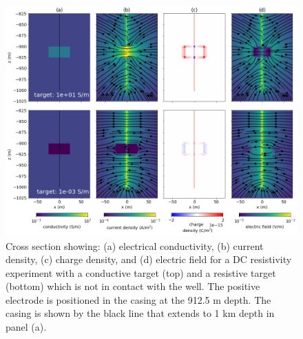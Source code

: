 \begin{figure}
    \begin{center}
    \includegraphics[width=\textwidth]{figures/dc_casing/offset_target_physics.png}
    \end{center}
\caption{
    Cross section showing: (a) electrical conductivity, (b) current density, (c) charge density, and
    (d) electric field for a DC resistivity experiment with a conductive target (top)
    and a resistive target (bottom) which is not in contact with the well.
    The positive electrode is positioned in the casing at the 912.5 m depth.
    The casing is shown by the black line that extends to 1 km
    depth in panel (a).
}
\label{fig:offset_target_physics}
\end{figure}
